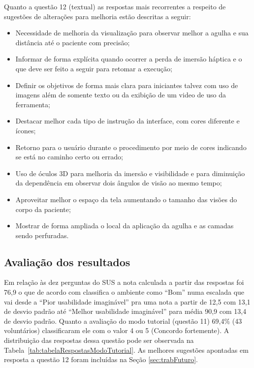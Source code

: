 Quanto a questão 12 (textual) as respostas mais recorrentes a respeito de sugestões de alterações para melhoria estão descritas a seguir:

\begin{itemize}
   \item Necessidade de melhoria da visualização para observar melhor a agulha e sua distância até o paciente com precisão;
   \item Informar de forma explícita quando ocorrer a perda de imersão háptica e o que deve ser feito a seguir para retomar a execução;
   \item Definir os objetivos de forma mais clara para iniciantes talvez com uso de imagens além de somente texto ou da exibição de um video de uso da ferramenta;
   \item Destacar melhor cada tipo de instrução da interface, com cores diferente e ícones;
   \item Retorno para o usuário durante o procedimento por meio de cores indicando se está no caminho certo ou errado;
   \item Uso de óculos 3D para melhoria da imersão e visibilidade e para diminuição da dependência em observar dois ângulos de visão ao mesmo tempo;
   \item Aproveitar melhor o espaço da tela aumentando o tamanho das visões do corpo da paciente;
   \item Mostrar de forma ampliada o local da aplicação da agulha e as camadas sendo perfuradas.
 \end{itemize}

\subsection{Avaliação dos resultados}
\label{sec:avaliacaoUsabilidde}

Em relação às dez perguntas do \acrshort{SUS} a nota calculada a partir das respostas foi 76,9 o que de acordo com \textcite{BangorAaron2009} classifica o ambiente como ``Bom'' numa escalada que vai desde a ``Pior usabilidade imaginável'' pra uma nota a partir de 12,5 com 13,1 de desvio padrão até ``Melhor usabilidade imaginável'' para média 90,9 com 13,4 de desvio padrão. 
Quanto a avaliação do modo tutorial (questão 11) 69,4\% (43 voluntários) classificaram ele com o valor 4 ou 5 (Concordo fortemente). A distribuição das respostas dessa questão pode ser observada na Tabela~\ref{tab:tabelaRespostasModoTutorial}. As melhores sugestões apontadas em resposta a questão 12 foram incluídas na Seção \ref{sec:trabFuturo}.

